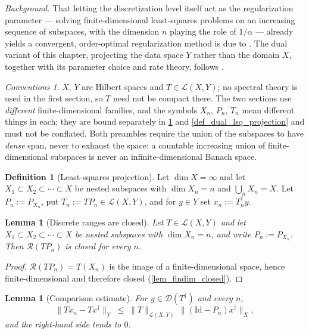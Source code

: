 \documentclass[a4paper]{report}
\theoremstyle{plain}
\newtheorem{lemma}[theorem]{Lemma}
\theoremstyle{definition}
\newtheorem{definition}[theorem]{Definition}
\theoremstyle{remark}
\newtheorem{assumptions}[theorem]{Conventions}
\newcommand{\Ll}{\mathcal{L}}
\newcommand{\Ran}{\mathcal{R}}
\newcommand{\Dom}{\mathcal{D}}
\newcommand{\Id}{\mathrm{Id}}
\newcommand{\dg}{^{\dagger}}
\begin{document}
\noindent\emph{Background.} That letting the discretization level itself act as the
regularization parameter --- solving finite-dimensional least-squares problems on an
increasing sequence of subspaces, with the dimension $n$ playing the role of
$1/\alpha$ --- already yields a convergent, order-optimal regularization method is due to
\citet{Natterer1977}. The dual variant of this chapter, projecting the data space $Y$
rather than the domain $X$, together with its parameter choice and rate theory, follows
\citet{PlatoVainikko1990}.

\begin{assumptions}
  \label{asm_discretization_as_regularization}
  $X$, $Y$ are Hilbert spaces and $T \in \Ll(X,Y)$;
no spectral theory is used in the first section, so $T$ need not be compact there.  The
two sections use \emph{different} finite-dimensional families, and the symbols $X_n$,
$P_n$, $T_n$ mean different things in each; they are bound separately in
\cref{def_lsq_projection} and \cref{def_dual_lsq_projection} and must not be conflated.
Both preambles require the union of the subspaces to have \emph{dense} span, never to
exhaust the space: a countable increasing union of finite-dimensional subspaces is never
an infinite-dimensional Banach space.
\end{assumptions}

\begin{definition}[Least-squares projection]
  \label{def_lsq_projection}
  Let $\dim X = \infty$ and let $X_1 \subset X_2 \subset \cdots \subset X$ be nested
  subspaces with $\dim X_n = n$ and $\overline{\bigcup_n X_n} = X$.  Let $P_n := P_{X_n}$, put
  $T_n := T P_n \in \Ll(X,Y)$, and for $y \in Y$ set $x_n := T_n\dg y$.
\end{definition}


\begin{lemma}[Discrete ranges are closed]
  \label{lem_lsq_range_closed}
  Let $T \in \Ll(X,Y)$ and let $X_1 \subset X_2 \subset \cdots \subset X$ be nested
  subspaces with $\dim X_n = n$, and write $P_n := P_{X_n}$.  Then $\Ran(TP_n)$ is closed
  for every $n$.
\end{lemma}

\begin{proof}
  $\Ran(TP_n) = T(X_n)$ is the image of a finite-dimensional space, hence
  finite-dimensional and therefore closed (\cref{lem_findim_closed}).
\end{proof}


\begin{lemma}[Comparison estimate]
  \label{lem_lsq_comparison}
  For $y \in \Dom(T\dg)$ and every $n$,
  \[
    \|Tx_n - Tx\dg\|_Y \;\le\; \|T\|_{\Ll(X,Y)}\,\|(\Id - P_n)x\dg\|_X ,
  \]
  and the right-hand side tends to $0$.
\end{lemma}
\end{document}
